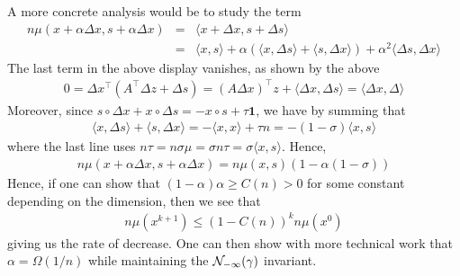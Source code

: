	A more concrete analysis would be to study the term
	\begin{eqnarray*}
	n \mu(x + \alpha \Delta x, s + \alpha \Delta x)  &=& \langle x + \Delta x ,  s + \Delta s \rangle \\
	&=& \langle x , s \rangle  + \alpha \left(\langle x, \Delta s \rangle + \langle s, \Delta x \rangle \right) + \alpha^2 \langle \Delta s, \Delta x \rangle
	\end{eqnarray*}
	The last term in the above display vanishes, as shown by the above
	\begin{eqnarray*}
	0 = \Delta x^\top (A^{\top} \Delta z + \Delta s) = (A\Delta x)^\top z + \langle \Delta x, \Delta s \rangle = \langle \Delta x, \Delta \rangle
	\end{eqnarray*}
	Moreover, since $s \circ \Delta x + x \circ \Delta s = - x \circ s + \tau \mathbf{1}$, we have by summing that 
	\begin{eqnarray*}
	\langle x, \Delta s \rangle + \langle s, \Delta x \rangle =  - \langle x , x \rangle + \tau n = - (1 - \sigma) \langle x, s \rangle
	\end{eqnarray*}
	where the last line uses $n \tau = n \sigma \mu = \sigma n \tau =  \sigma \langle x, s \rangle$. Hence,
	\begin{eqnarray*}
	n \mu(x + \alpha \Delta x, s + \alpha \Delta x) = n \mu(x,s) (1 - \alpha(1-\sigma))
	\end{eqnarray*}
	Hence, if one can show that $(1-\alpha)\alpha \ge C(n) > 0$ for some constant depending on the dimension, then we see that
	\begin{eqnarray*}
	n \mu(x^{k+1}) \le (1 - C(n))^{k} n \mu(x^0)
	\end{eqnarray*}
	giving us the rate of decrease. One can then show with more technical work that $\alpha = \Omega(1/n)$ while maintaining the ${\cal N}_{-\infty}(\gamma)$ invariant.
